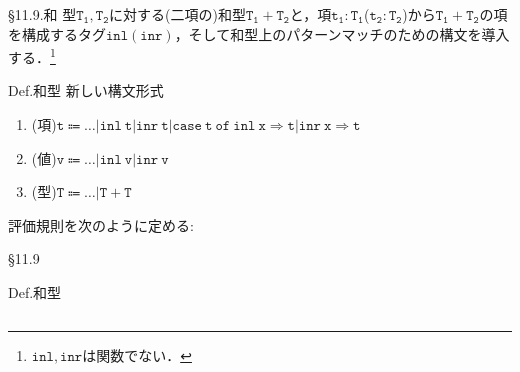\documentclass[9pt]{beamer}
\begin{document}
\begin{frame}{\S11.9.和}
型$\mathtt{T_{1},T_{2}}$に対する(二項の)和型$\mathtt{T_{1}+T_{2}}$と，項$\mathtt{t_{1}:T_{1}}$($\mathtt{t_{2}:T_{2}}$)から$\mathtt{T_{1}+T_{2}}$の項を構成するタグ$\mathtt{inl}(\mathtt{inr})$，そして和型上のパターンマッチのための構文を導入する．\footnote{$\mathtt{inl,inr}$は関数でない．}
\begin{alertblock}{Def.和型}
新しい構文形式\begin{enumerate}
\item (項)$\mathtt{t\Coloneq\ldots|inl\ t|inr\ t|case\ t\ of\ inl\ x\Rightarrow t|inr\ x\Rightarrow t}$
\item (値)$\mathtt{v\Coloneq\ldots|inl\ v|inr\ v}$
\item (型)$\mathtt{T\Coloneq\ldots|T+T}$
\end{enumerate}
評価規則を次のように定める:
\end{alertblock}
\end{frame}
\begin{frame}{\S11.9}
\begin{alertblock}{Def.和型}
\begin{columns}
\begin{column}{0.5\columnwidth}
\end{column}
\begin{column}{0.5\columnwidth}
\end{column}
\end{columns}
\end{alertblock}
\end{frame}
\end{document}
